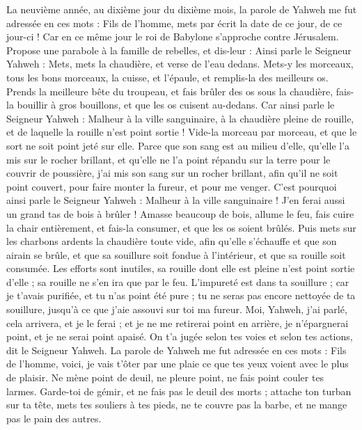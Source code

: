 \begin{multicols}{2}
\VerseOne{}La neuvième année, au dixième jour du dixième mois, la parole de Yahweh me fut adressée en ces mots :
Fils de l’homme, mets par écrit la date de ce jour, de ce jour-ci ! Car en ce même jour le roi de Babylone s'approche contre Jérusalem\FTNT{}.
Propose une parabole à la famille de rebelles, et dis-leur : Ainsi parle le Seigneur Yahweh : Mets, mets la chaudière, et verse de l'eau dedans.
Mets-y les morceaux, tous les bons morceaux, la cuisse, et l'épaule, et remplis-la des meilleurs os.
Prends la meilleure bête du troupeau, et fais brûler des os sous la chaudière, fais-la bouillir à gros bouillons, et que les os cuisent au-dedans.
Car ainsi parle le Seigneur Yahweh : Malheur à la ville sanguinaire, à la chaudière pleine de rouille, et de laquelle la rouille n'est point sortie ! Vide-la morceau par morceau, et que le sort ne soit point jeté sur elle.
Parce que son sang est au milieu d'elle, qu'elle l'a mis sur le rocher brillant, et qu'elle ne l'a point répandu sur la terre pour le couvrir de poussière,
j'ai mis son sang sur un rocher brillant, afin qu'il ne soit point couvert, pour faire monter la fureur, et pour me venger.
C'est pourquoi ainsi parle le Seigneur Yahweh : Malheur à la ville sanguinaire ! J'en ferai aussi un grand tas de bois à brûler !
Amasse beaucoup de bois, allume le feu, fais cuire la chair entièrement, et fais-la consumer, et que les os soient brûlés.
Puis mets sur les charbons ardents la chaudière toute vide, afin qu'elle s'échauffe et que son airain se brûle, et que sa souillure soit fondue à l’intérieur, et que sa rouille soit consumée.
Les efforts sont inutiles, sa rouille dont elle est pleine n'est point sortie d'elle ; sa rouille ne s'en ira que par le feu.
L’impureté est dans ta souillure ; car je t'avais purifiée, et tu n'as point été pure ; tu ne seras pas encore nettoyée de ta souillure, jusqu'à ce que j’aie assouvi sur toi ma fureur.
Moi, Yahweh, j'ai parlé, cela arrivera, et je le ferai ; et je ne me retirerai point en arrière, je n'épargnerai point, et je ne serai point apaisé. On t'a jugée selon tes voies et selon tes actions, dit le Seigneur Yahweh.
La parole de Yahweh me fut adressée en ces mots :
Fils de l’homme, voici, je vais t'ôter par une plaie ce que tes yeux voient avec le plus de plaisir. Ne mène point de deuil, ne pleure point, ne fais point couler tes larmes\FTNT{}.
Garde-toi de gémir, et ne fais pas le deuil des morts ; attache ton turban sur ta tête, mets tes souliers à tes pieds, ne te couvre pas la barbe, et ne mange pas le pain des autres\FTNT{}.

\end{multicols}
